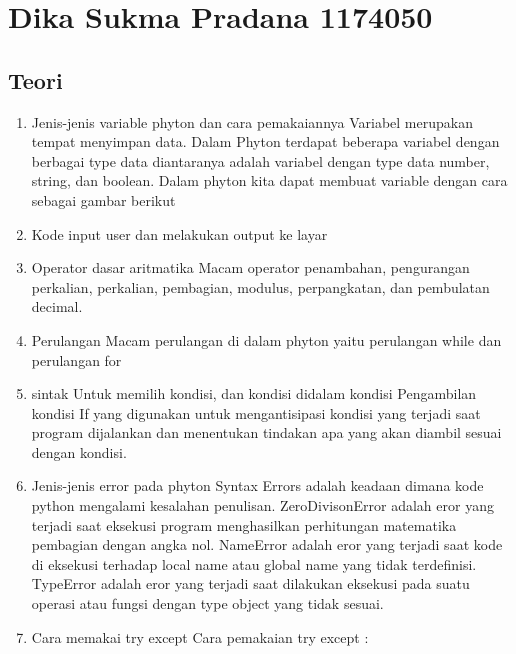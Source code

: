 \section{Dika Sukma Pradana 1174050}
\subsection{Teori}
\begin{enumerate}
	\item Jenis-jenis variable phyton dan cara pemakaiannya
Variabel merupakan tempat menyimpan data. Dalam Phyton terdapat beberapa variabel dengan berbagai type data diantaranya adalah variabel dengan type data number, string, dan boolean. Dalam phyton kita dapat membuat variable dengan cara sebagai gambar berikut
   
	\item Kode input user dan melakukan output ke layar
 
	\item Operator dasar aritmatika
Macam operator penambahan, pengurangan perkalian, perkalian, pembagian, modulus, perpangkatan, dan pembulatan decimal.

	\item Perulangan
Macam perulangan di dalam phyton yaitu perulangan while dan perulangan for
 
 
	\item sintak Untuk memilih kondisi, dan kondisi didalam kondisi
Pengambilan kondisi If yang digunakan untuk mengantisipasi kondisi yang terjadi saat program dijalankan dan menentukan tindakan apa yang akan diambil sesuai dengan kondisi.
  
  
  

	\item Jenis-jenis error pada phyton
Syntax Errors adalah keadaan dimana kode python mengalami kesalahan penulisan. 
ZeroDivisonError adalah eror yang terjadi saat eksekusi program menghasilkan perhitungan matematika pembagian dengan angka nol.
NameError adalah eror yang terjadi saat kode di eksekusi terhadap local name atau global name yang tidak terdefinisi. 
TypeError adalah eror yang terjadi saat dilakukan eksekusi pada suatu operasi atau fungsi dengan type object yang tidak sesuai.

	\item Cara memakai try except
Cara pemakaian try except :


\end{enumerate}

